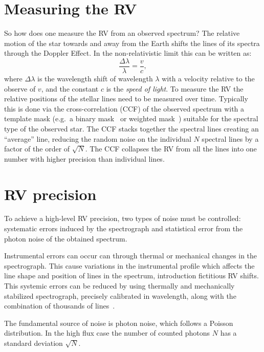 
\section{Measuring the {RV}}
\label{sec:measuring_rv}
So how does one measure the RV from an observed spectrum?
The relative motion of the star towards and away from the Earth shifts the lines of its spectra through the Doppler Effect.
In the non-relativistic limit this can be written as:
\begin{equation}
\frac{\Delta\lambda}{\lambda} = \frac{v}{c},
\end{equation}
where $\Delta\lambda$ is the wavelength shift of wavelength $\lambda$ with a velocity relative to the observe of \(v\), and the constant $c$ is the \emph{speed of light}.
To measure the {RV} the relative positions of the stellar lines need to be measured over time.
Typically this is done via the cross-correlation ({CCF}) of the observed spectrum with a template mask (e.g.\ a binary mask~\citep{baranne_elodie_1996} or weighted mask~\citep{pepe_coralie_2002}) suitable for the spectral type of the observed star.
The {CCF} stacks together the spectral lines creating an ``average'' line, reducing the random noise on the individual $N$ spectral lines by a factor of the order of $\sqrt{N}$.
The {CCF} collapses the {RV} from all the lines into one number with higher precision than individual lines.


\section{{RV} precision}
\label{sec:rv_precision}
To achieve a high-level {RV} precision, two types of noise must be controlled: systematic errors induced by the spectrograph and statistical error from the photon noise of the obtained spectrum.

Instrumental errors can occur can through thermal or mechanical changes in the spectrograph. This cause variations in the instrumental profile which affects the line shape and position of lines in the spectrum, introduction fictitious RV shifts.
This systemic errors can be reduced by using thermally and mechanically stabilized spectrograph, precisely calibrated in wavelength, along with the combination of thousands of lines~\citep[e.g.][]{pepe_instrumentation_2014}.

The fundamental source of noise is photon noise, which follows a {Poisson} distribution.
In the high flux case the number of counted photons $N$ has a standard deviation $\sqrt{N}$.


